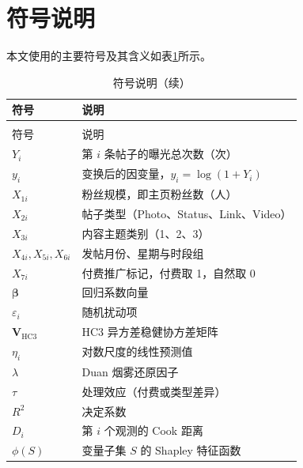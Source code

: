 \section{符号说明}

本文使用的主要符号及其含义如表\ref{tab:符号说明}所示。

\begin{longtable}{>{\centering\arraybackslash}p{}>{\centering\arraybackslash}p{}}
  \caption{符号说明}
  \label{tab:符号说明} \\
  \toprule
  符号 & 说明 \\
  \midrule
  \endfirsthead
  \caption{符号说明（续）} \\
  \toprule
  符号 & 说明 \\
  \midrule
  \endhead
  \bottomrule
  \endfoot
  $Y_i$ & 第 $i$ 条帖子的曝光总次数（次） \\
  $y_i$ & 变换后的因变量，$y_i=\log(1+Y_i)$ \\
  $X_{1i}$ & 粉丝规模，即主页粉丝数（人） \\
  $X_{2i}$ & 帖子类型（Photo、Status、Link、Video） \\
  $X_{3i}$ & 内容主题类别（1、2、3） \\
  $X_{4i},X_{5i},X_{6i}$ & 发帖月份、星期与时段组 \\
  $X_{7i}$ & 付费推广标记，付费取 1，自然取 0 \\
  $\boldsymbol{\beta}$ & 回归系数向量 \\
  $\varepsilon_i$ & 随机扰动项 \\
  $\boldsymbol{V}_{\mathrm{HC3}}$ & HC3 异方差稳健协方差矩阵 \\
  $\eta_i$ & 对数尺度的线性预测值 \\
  $\lambda$ & Duan 烟雾还原因子 \\
  $\tau$ & 处理效应（付费或类型差异） \\
  $R^2$ & 决定系数 \\
  $D_i$ & 第 $i$ 个观测的 Cook 距离 \\
  $\phi(S)$ & 变量子集 $S$ 的 Shapley 特征函数
\end{longtable}
